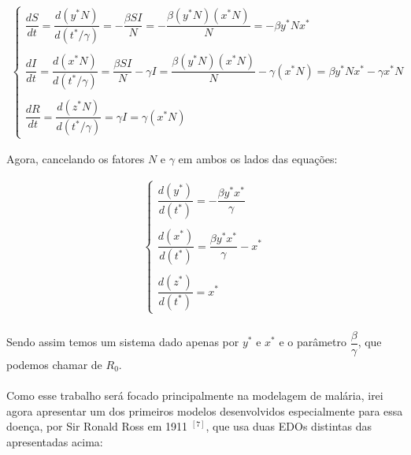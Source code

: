 \documentclass[12pt]{article}
\begin{document}
\begin{gather*}
\begin{cases}
\dfrac{dS}{dt} = \dfrac{d(y^*N)}{d(t^*/\gamma)} = -\dfrac{\beta SI}{N} = -\dfrac{\beta(y^*N)(x^*N)}{N} = -\beta y^*Nx^* \\
\\
\dfrac{dI}{dt} = \dfrac{d(x^*N)}{d(t^*/\gamma)} = \dfrac{\beta SI}{N} - \gamma I = \dfrac{\beta(y^*N)(x^*N)}{N} -\gamma(x^*N) = \beta y^*Nx^* - \gamma x^*N \\
\\
\dfrac{dR}{dt} = \dfrac{d(z^*N)}{d(t^*/\gamma)} = \gamma I = \gamma(x^*N)
\end{cases}
\end{gather*}

Agora, cancelando os fatores $N$ e $\gamma$ em ambos os lados das equações:

\begin{gather*}
\begin{cases}
\dfrac{d(y^*)}{d(t^*)} = -\dfrac{\beta y^*x^*}{\gamma} \\
\\
\dfrac{d(x^*)}{d(t^*)} = \dfrac{\beta y^*x^*}{\gamma} - x^* \\
\\
\dfrac{d(z^*)}{d(t^*)} = x^*
\end{cases}
\end{gather*}
\\
Sendo assim temos um sistema dado apenas por $y^*$ e $x^*$ e o parâmetro $\dfrac{\beta}{\gamma}$, que podemos chamar de $R_0$.
\\\\
Como esse trabalho será focado principalmente na modelagem de malária, irei agora apresentar um dos primeiros modelos desenvolvidos especialmente para essa doença, por Sir Ronald Ross em 1911 $^{[7]}$, que usa duas EDOs distintas das apresentadas acima:
\end{document}

